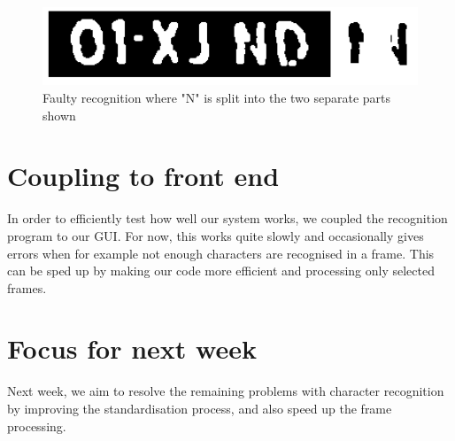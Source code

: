 \documentclass{tudelftposter}
\begin{document}
\begin{figure}[h]
	\centering
	\includegraphics[width=800pt]{brokenNplate.png}
	\caption{Faulty recognition where "N" is split into the two separate parts shown}
	\label{brokenN}
\end{figure}

\section{Coupling to front end}
In order to efficiently test how well our system works, we coupled the recognition program to our GUI. For now, this works quite slowly and occasionally gives errors when for example not enough characters are recognised in a frame. This can be sped up by making our code more efficient and processing only selected frames.

\section{Focus for next week}
Next week, we aim to resolve the remaining problems with character recognition by improving the standardisation process, and also speed up the frame processing.
\end{document}
